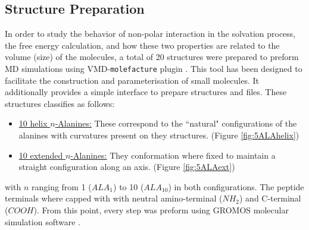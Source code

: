 \subsection{Structure Preparation}\label{subsec:strucutre_prep}

In order to study the behavior of non-polar interaction in the solvation process, the free energy calculation, and how these two properties are related to the volume (size) of the molecules, a total of 20 structures were prepared to preform MD simulations using VMD-\texttt{molefacture} plugin \cite{humphrey1996vmd}. This tool has been designed to facilitate the construction and parameterisation of small molecules. It additionally provides a simple interface to prepare structures and files. These structures classifies as follows:
\begin{itemize}
    \item \underline{10 helix $n$-Alanines:} These correspond to the ``natural" configurations of the alanines with curvatures present on they structures. (Figure \ref{fig:5ALAhelix})
    \item \underline{10 extended $n$-Alanines:} They conformation where fixed to maintain a straight configuration along an axis. (Figure \ref{fig:5ALAext})
\end{itemize}   
with $n$ ranging from 1 ($ALA_1$)  to 10 ($ALA_{10}$) in both configurations. The peptide terminals where capped with with neutral amino-terminal ($NH_2$) and C-terminal ($COOH$). From this point, every step was preform using GROMOS molecular simulation software \cite{basharat2016structure}. 

